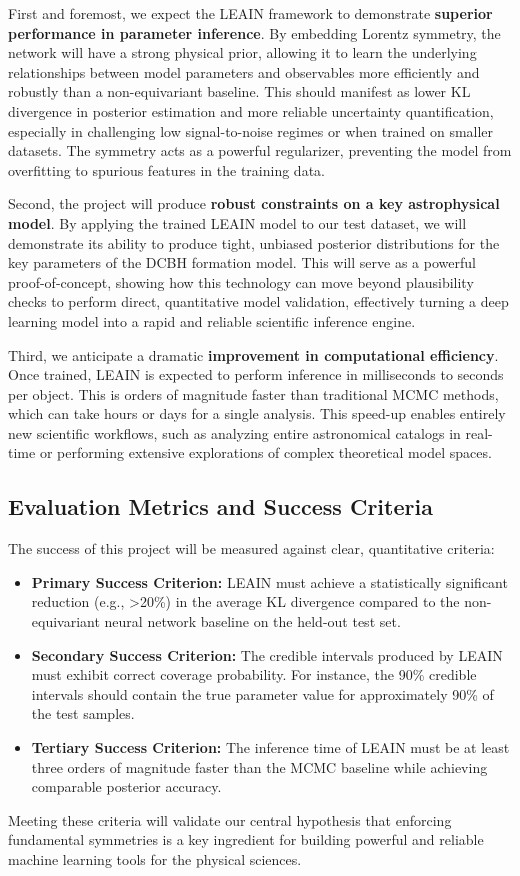 \documentclass[11pt, a4paper]{article}
\begin{document}
First and foremost, we expect the LEAIN framework to demonstrate \textbf{superior performance in parameter inference}. By embedding Lorentz symmetry, the network will have a strong physical prior, allowing it to learn the underlying relationships between model parameters and observables more efficiently and robustly than a non-equivariant baseline. This should manifest as lower KL divergence in posterior estimation and more reliable uncertainty quantification, especially in challenging low signal-to-noise regimes or when trained on smaller datasets. The symmetry acts as a powerful regularizer, preventing the model from overfitting to spurious features in the training data.

Second, the project will produce \textbf{robust constraints on a key astrophysical model}. By applying the trained LEAIN model to our test dataset, we will demonstrate its ability to produce tight, unbiased posterior distributions for the key parameters of the DCBH formation model. This will serve as a powerful proof-of-concept, showing how this technology can move beyond plausibility checks to perform direct, quantitative model validation, effectively turning a deep learning model into a rapid and reliable scientific inference engine.

Third, we anticipate a dramatic \textbf{improvement in computational efficiency}. Once trained, LEAIN is expected to perform inference in milliseconds to seconds per object. This is orders of magnitude faster than traditional MCMC methods, which can take hours or days for a single analysis. This speed-up enables entirely new scientific workflows, such as analyzing entire astronomical catalogs in real-time or performing extensive explorations of complex theoretical model spaces.

\subsection{Evaluation Metrics and Success Criteria}
The success of this project will be measured against clear, quantitative criteria:
\begin{itemize}
    \item \textbf{Primary Success Criterion:} LEAIN must achieve a statistically significant reduction (e.g., >20\%) in the average KL divergence compared to the non-equivariant neural network baseline on the held-out test set.
    \item \textbf{Secondary Success Criterion:} The credible intervals produced by LEAIN must exhibit correct coverage probability. For instance, the 90\% credible intervals should contain the true parameter value for approximately 90\% of the test samples.
    \item \textbf{Tertiary Success Criterion:} The inference time of LEAIN must be at least three orders of magnitude faster than the MCMC baseline while achieving comparable posterior accuracy.
\end{itemize}
Meeting these criteria will validate our central hypothesis that enforcing fundamental symmetries is a key ingredient for building powerful and reliable machine learning tools for the physical sciences.
\end{document}
